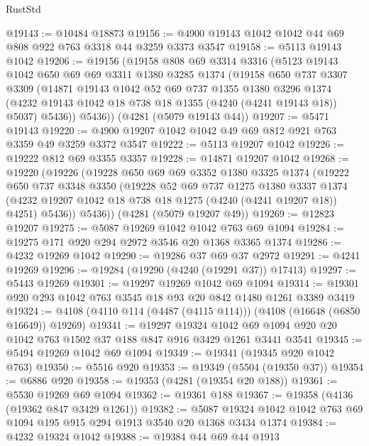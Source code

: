 \begin{lexlean}{RustStd}
\begin{coremodule}
{\begin{coremodule}
{{{{{{{{{{{{{{{{{{{{{{{{{{{{{{{{{{{@19143 := @10484 @18873
@19156 := @4900 @19143 @1042 @1042 @44 @69 @808 @922 @763 @3318 @44 @3259 @3373 @3547
@19158 := @5113 @19143 @1042
@19206 := @19156
    (@19158
      @808
      @69
      @3314
      @3316
      (@5123
        @19143
        @1042
        @650
        @69
        @69
        @3311
        @1380
        @3285
        @1374
        (@19158
          @650
          @737
          @3307
          @3309
          (@14871
            @19143
            @1042
            @52
            @69
            @737
            @1355
            @1380
            @3296
            @1374
            (@4232 @19143 @1042 @18 @738 @18 @1355 (@4240 (@4241 @19143 @18)) @5037)
            @5436))
        @5436))
    (@4281 (@5079 @19143 @44))
@19207 := @5471 @19143
@19220 := @4900 @19207 @1042 @1042 @49 @69 @812 @921 @763 @3359 @49 @3259 @3372 @3547
@19222 := @5113 @19207 @1042
@19226 := @19222 @812 @69 @3355 @3357
@19228 := @14871 @19207 @1042
@19268 := @19220
    (@19226
      (@19228
        @650
        @69
        @69
        @3352
        @1380
        @3325
        @1374
        (@19222
          @650
          @737
          @3348
          @3350
          (@19228
            @52
            @69
            @737
            @1275
            @1380
            @3337
            @1374
            (@4232 @19207 @1042 @18 @738 @18 @1275 (@4240 (@4241 @19207 @18)) @4251)
            @5436))
        @5436))
    (@4281 (@5079 @19207 @49))
@19269 := @12823 @19207
@19275 := @5087 @19269 @1042 @1042 @763 @69 @1094
@19284 := @19275 @171 @920 @294 @2972 @3546 @20 @1368 @3365 @1374
@19286 := @4232 @19269 @1042
@19290 := @19286 @37 @69 @37 @2972
@19291 := @4241 @19269
@19296 := @19284 (@19290 (@4240 (@19291 @37)) @17413)
@19297 := @5443 @19269
@19301 := @19297 @19269 @1042 @69 @1094
@19314 := @19301 @920 @293 @1042 @763 @3545 @18 @93 @20 @842 @1480 @1261 @3389 @3419
@19324 := @4108 (@4110 @114 (@4487 (@4115 @114))) (@4108 (@16648 (@6850 @16649)) @19269)
@19341 := @19297
    @19324
    @1042
    @69
    @1094
    @920
    @20
    @1042
    @763
    @1502
    @37
    @188
    @847
    @916
    @3429
    @1261
    @3441
    @3541
@19345 := @5494 @19269 @1042 @69 @1094
@19349 := @19341 (@19345 @920 @1042 @763)
@19350 := @5516 @920
@19353 := @19349 (@5504 (@19350 @37))
@19354 := @6886 @920
@19358 := @19353 (@4281 (@19354 @20 @188))
@19361 := @5530 @19269 @69 @1094
@19362 := @19361 @188
@19367 := @19358 (@4136 (@19362 @847 @3429 @1261))
@19382 := @5087 @19324 @1042 @1042 @763 @69 @1094 @195 @915 @294 @1913 @3540 @20 @1368 @3434 @1374
@19384 := @4232 @19324 @1042
@19388 := @19384 @44 @69 @44 @1913
}}}}}}}}}}}}}}}}}}}}}}}}}}}}}}}}}}}
\end{coremodule}}
\end{coremodule}
\end{lexlean}
